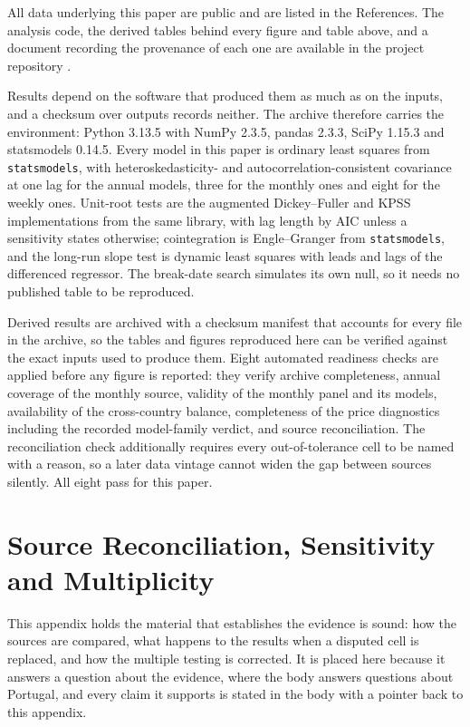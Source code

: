 \documentclass[11pt,a4paper]{article}
\begin{document}
All data underlying this paper are public and are listed in the References. The analysis
code, the derived tables behind every figure and table above, and a document recording the
provenance of each one are available in the project repository \citep{repository}.

Results depend on the software that produced them as much as on the inputs, and a checksum over
outputs records neither. The archive therefore carries the environment: Python 3.13.5 with NumPy
2.3.5, pandas 2.3.3, SciPy 1.15.3 and statsmodels 0.14.5. Every model in this paper is ordinary
least squares from \texttt{statsmodels}, with heteroskedasticity- and autocorrelation-consistent
covariance at one lag for the annual models, three for the monthly ones and eight for the weekly
ones. Unit-root tests are the augmented Dickey--Fuller and KPSS implementations from the same
library, with lag length by AIC unless a sensitivity states otherwise; cointegration is Engle--Granger
from \texttt{statsmodels}, and the long-run slope test is dynamic least squares with
leads and lags of the differenced regressor. The break-date search simulates its own null, so it
needs no published table to be reproduced.

Derived results are archived with a checksum manifest that accounts for every file in the
archive, so the tables and figures reproduced here can be verified against the exact inputs
used to produce them. Eight automated readiness checks are applied before any figure is
reported: they verify archive completeness, annual coverage of the monthly source, validity
of the monthly panel and its models, availability of the cross-country balance, completeness
of the price diagnostics including the recorded model-family verdict, and source
reconciliation. The reconciliation check additionally requires every out-of-tolerance cell to
be named with a reason, so a later data vintage cannot widen the gap between sources
silently. All eight pass for this paper.


\section{Source Reconciliation, Sensitivity and Multiplicity}
\label{app:audit}

This appendix holds the material that establishes the evidence is sound: how the sources are
compared, what happens to the results when a disputed cell is replaced, and how the multiple
testing is corrected. It is placed here because it answers a question about the evidence, where
the body answers questions about Portugal, and every claim it supports is stated in the body
with a pointer back to this appendix.
\end{document}
